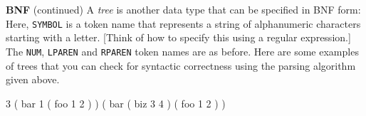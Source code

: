 \begin{minipage}[t]{\sw}
\slidenumber
\LARGE
{\bf BNF} (continued)\exx
A {\em tree} is another data type that can be specified in BNF form:\exx
\emm{\NormalBox{\MYtree}}\exx
Here, \verb'SYMBOL' is a token name that represents a string
of alphanumeric characters starting with a letter.
[Think of how to specify this using a regular expression.]
The \verb'NUM', \verb'LPAREN' and \verb'RPAREN' token names are as before.\exx
Here are some examples of trees
that you can check for syntactic correctness
using the parsing algorithm given above.
\begin{qv}
3
( bar 1 ( foo 1 2 ) )
( bar ( biz 3 4 ) ( foo 1 2 ) )
\end{qv}
\end{minipage}
\clearpage
